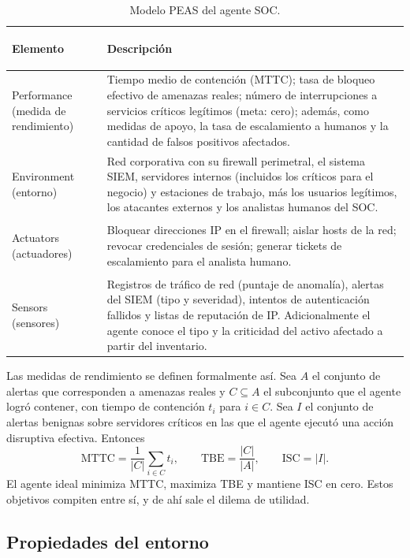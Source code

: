 \documentclass[11pt,a4paper]{article}
\begin{document}
\begin{table}[!t]
\centering
\caption{Modelo PEAS del agente SOC.}\label{tab:peas}
\small
\begin{tabularx}{\textwidth}{>{\bfseries\raggedright\arraybackslash}p{2.6cm}X}
\toprule
\textnormal{Elemento} & Descripción \\
\midrule
Performance (medida de rendimiento) &
Tiempo medio de contención (MTTC); tasa de bloqueo efectivo de amenazas reales; número de interrupciones a servicios críticos legítimos (meta: cero); además, como medidas de apoyo, la tasa de escalamiento a humanos y la cantidad de falsos positivos afectados. \\
\addlinespace
Environment (entorno) &
Red corporativa con su firewall perimetral, el sistema SIEM, servidores internos (incluidos los críticos para el negocio) y estaciones de trabajo, más los usuarios legítimos, los atacantes externos y los analistas humanos del SOC. \\
\addlinespace
Actuators (actuadores) &
Bloquear direcciones IP en el firewall; aislar hosts de la red; revocar credenciales de sesión; generar tickets de escalamiento para el analista humano. \\
\addlinespace
Sensors (sensores) &
Registros de tráfico de red (puntaje de anomalía), alertas del SIEM (tipo y severidad), intentos de autenticación fallidos y listas de reputación de IP. Adicionalmente el agente conoce el tipo y la criticidad del activo afectado a partir del inventario. \\
\bottomrule
\end{tabularx}
\end{table}

Las medidas de rendimiento se definen formalmente así. Sea $A$ el conjunto de alertas que corresponden a amenazas reales y $C\subseteq A$ el subconjunto que el agente logró contener, con tiempo de contención $t_i$ para $i\in C$. Sea $I$ el conjunto de alertas benignas sobre servidores críticos en las que el agente ejecutó una acción disruptiva efectiva. Entonces
\begin{equation}
\mathrm{MTTC}=\frac{1}{|C|}\sum_{i\in C}t_i,\qquad
\mathrm{TBE}=\frac{|C|}{|A|},\qquad
\mathrm{ISC}=|I|.
\end{equation}
El agente ideal minimiza MTTC, maximiza TBE y mantiene ISC en cero. Estos objetivos compiten entre sí, y de ahí sale el dilema de utilidad.

\subsection{Propiedades del entorno}
\end{document}
